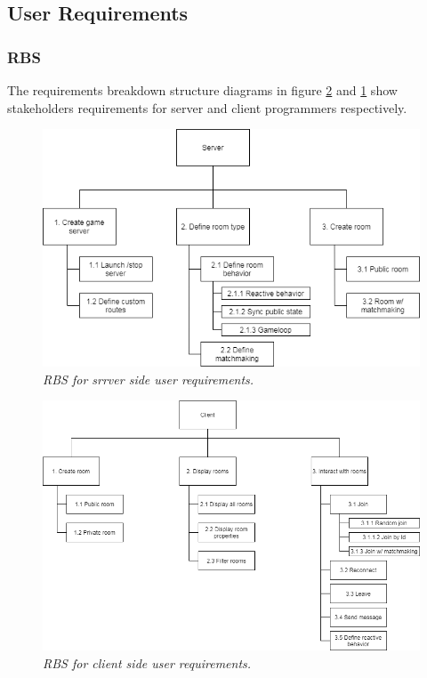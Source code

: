 \subsection{User Requirements}

\subsubsection{RBS}

The requirements breakdown structure diagrams in figure \ref{fig:client-RBS} and \ref{fig:server-RBS} show stakeholders requirements for server and client programmers respectively.  

\begin{figure}[H]
  \includegraphics[scale=0.5]{images/2-scoping/server-RBS.png}
   \centering  
   \caption{\textit{RBS for srrver side user requirements.}}
  \label{fig:server-RBS}
\end{figure}

\begin{figure}[H]
  \includegraphics[scale=0.5]{images/2-scoping/client-RBS.png}
   \centering  
   \caption{\textit{RBS for client side user requirements.}}
  \label{fig:client-RBS}
\end{figure}
 
